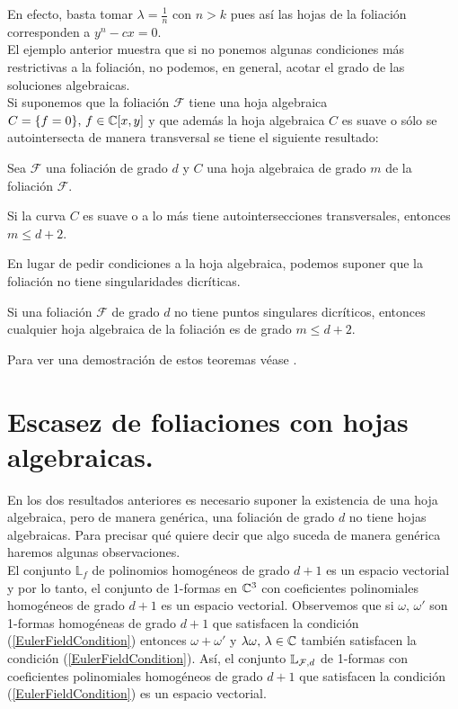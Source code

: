 En efecto, basta tomar $\lambda = \tfrac{1}{n}$ con $n>k$ pues así las hojas de la foliación corresponden a $y^n - cx = 0$.
\\

El ejemplo anterior muestra que si no ponemos algunas condiciones más restrictivas a la foliación, no podemos, en general, acotar el grado de las soluciones algebraicas.\\

Si suponemos que la foliación $\mathcal{F}$ tiene una hoja algebraica $C=\{ f=0\}, \, f\in\mathbb{C}[x,y]$ y que además la hoja algebraica $C$ es suave o sólo se autointersecta de manera transversal se tiene el siguiente resultado:\\

\begin{Teorema}
\label{Teo:CotaHojaSuave}
Sea $\mathcal{F}$ una foliación de grado $d$ y $C$ una hoja algebraica de grado $m$ de la foliación $\mathcal{F}$.

Si la curva $C$ es suave o a lo más tiene autointersecciones transversales, entonces $m\leq d+2$.
\end{Teorema}

En lugar de pedir condiciones a la hoja algebraica, podemos suponer que la foliación no tiene singularidades dicríticas.

\begin{Teorema}
\label{Teo:CotaSingularidadesNoDicriticas}
Si una foliación $\mathcal{F}$ de grado $d$ no tiene puntos singulares dicríticos, entonces cualquier hoja algebraica de la foliación es de grado $m\leq d+2$.
\end{Teorema}

Para ver una demostración de estos teoremas véase \cite{IlyaYako}.

\section{Escasez de foliaciones con hojas algebraicas.}

En los dos resultados anteriores es necesario suponer la existencia de una hoja algebraica, pero de manera genérica, una foliación de grado $d$ no tiene hojas algebraicas. Para precisar qué quiere decir que algo suceda de manera genérica haremos algunas observaciones.\\

El conjunto $\mathbb{L}_{f}$ de polinomios homogéneos de grado $d+1$ es un espacio vectorial y por lo tanto, el conjunto de 1-formas en $\mathbb{C}^{3}$ con coeficientes polinomiales homogéneos de grado $d+1$ es un espacio vectorial. Observemos que si $\omega, \, \omega'$ son 1-formas homogéneas de grado $d+1$ que satisfacen la condición (\ref{EulerFieldCondition}) entonces $\omega + \omega'$ y $\lambda\omega,\, \lambda\in\mathbb{C}$ también satisfacen la condición (\ref{EulerFieldCondition}). Así, el conjunto $\mathbb{L}_{\mathcal{F},d}$ de 1-formas  con coeficientes polinomiales homogéneos  de grado $d+1$ que satisfacen la condición (\ref{EulerFieldCondition}) es un espacio vectorial.\\


